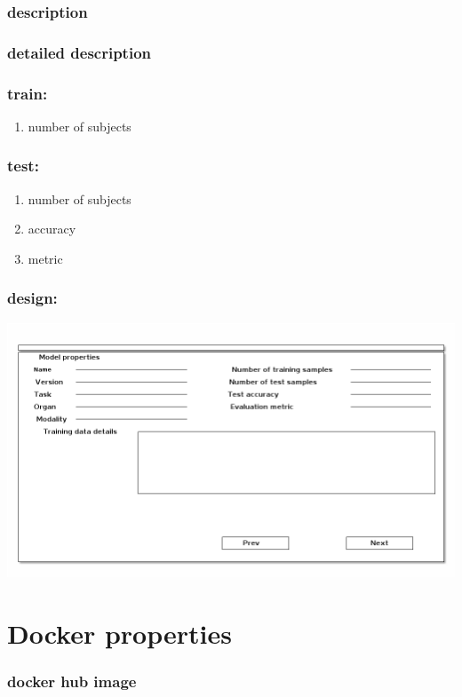 \documentclass[11pt]{article}
\begin{document}
\subsubsection{description}
\label{sec-2-0-7}
\subsubsection{detailed description}
\label{sec-2-0-8}
\subsubsection{train:}
\label{sec-2-0-9}
\begin{enumerate}
\item number of subjects
\label{sec-2-0-9-1}
\end{enumerate}
\subsubsection{test:}
\label{sec-2-0-10}
\begin{enumerate}
\item number of subjects
\label{sec-2-0-10-1}
\item accuracy
\label{sec-2-0-10-2}
\item metric
\label{sec-2-0-10-3}
\end{enumerate}
\subsubsection{design:}
\label{sec-2-0-11}
\includegraphics[width=.9\linewidth]{model-prop.png}

\section{Docker properties}
\label{sec-3}
\subsubsection{docker hub image}
\label{sec-3-0-1}
\end{document}
